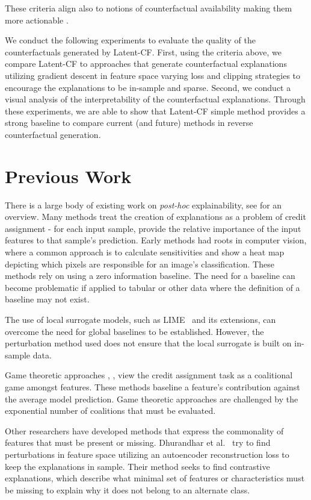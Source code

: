 \documentclass[letterpaper]{article} %
\begin{document}
These criteria align also to notions of counterfactual availability making them more actionable \cite{Fazelpour2020}.

We conduct the following experiments to evaluate the quality of the counterfactuals generated by Latent-CF. First, using the criteria above, we compare Latent-CF to approaches that generate counterfactual explanations utilizing gradient descent in feature space varying loss and clipping strategies to encourage the explanations to be in-sample and sparse.  Second, we conduct a visual analysis of the interpretability of the counterfactual explanations. Through these experiments, we are able to show that Latent-CF simple method provides a strong baseline to compare current (and future) methods in reverse counterfactual generation. 

\section{Previous Work}
There is a large body of existing work on \textit{post-hoc} explainability, see \citet{molnar2019} for an overview.  Many methods treat the creation of explanations as a problem of credit assignment - for each input sample, provide the relative importance of the input features to that sample's prediction.  Early methods had roots in computer vision, where a common approach is to calculate sensitivities and show a heat map depicting which pixels are responsible for an image's classification. These methods \citep[e.g.][]{shrikumar2017} rely on using a zero information baseline.  The need for a baseline can become problematic if applied to tabular or other data where the definition of a baseline may not exist.

The use of local surrogate models, such as LIME~\cite{ribeiro2016} and its extensions,  can overcome the need for global baselines to be established.  However, the perturbation method used does not ensure that the local surrogate is built on in-sample data.

Game theoretic approaches \cite{strumbelj2010}, \cite{datta2016}, \cite{lundberg2017} view the credit assignment task as a coalitional game amongst features. These methods baseline a feature's contribution against the average model prediction.  Game theoretic approaches are challenged by the exponential number of coalitions that must be evaluated.  

Other researchers have developed methods that express the commonality of features that must be present or missing.  Dhurandhar et al.~\cite{dhurandhar2018} try to find perturbations in feature space utilizing an autoencoder reconstruction loss to keep the explanations in sample. Their method seeks to find contrastive explanations, which describe what minimal set of features or characteristics must be missing to explain why it does not belong to an alternate class. 
\end{document}
